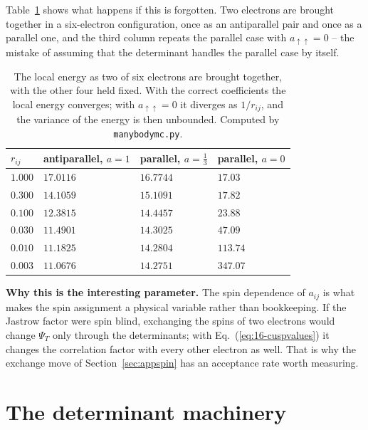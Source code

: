Table~\ref{tab:16-cusp} shows what happens if this is forgotten.  Two electrons
are brought together in a six-electron configuration, once as an antiparallel
pair and once as a parallel one, and the third column repeats the parallel case
with $a_{\uparrow\uparrow}=0$ -- the mistake of assuming that the determinant
handles the parallel case by itself.

\begin{table}[h]
\centering
\renewcommand{\arraystretch}{1.2}
\setlength{\tabcolsep}{14pt}
\begin{tabular}{llll}
\toprule
$r_{ij}$ & antiparallel, $a=1$ & parallel, $a=\tfrac13$
  & parallel, $a=0$\\
\midrule
$1.000$ & $17.0116$ & $16.7744$ & $17.03$\\
$0.300$ & $14.1059$ & $15.1091$ & $17.82$\\
$0.100$ & $12.3815$ & $14.4457$ & $23.88$\\
$0.030$ & $11.4901$ & $14.3025$ & $47.09$\\
$0.010$ & $11.1825$ & $14.2804$ & $113.74$\\
$0.003$ & $11.0676$ & $14.2751$ & $347.07$\\
\bottomrule
\end{tabular}
\caption{The local energy as two of six electrons are brought together, with
the other four held fixed.  With the correct coefficients the local energy
converges; with $a_{\uparrow\uparrow}=0$ it diverges as $1/r_{ij}$, and the
variance of the energy is then unbounded.  Computed by
\texttt{manybodymc.py}.}
\label{tab:16-cusp}
\end{table}

\begin{notebox}
\textbf{Why this is the interesting parameter.}  The spin dependence of
$a_{ij}$ is what makes the spin assignment a physical variable rather than
bookkeeping.  If the Jastrow factor were spin blind, exchanging the spins of
two electrons would change $\Psi_T$ only through the determinants; with
Eq.~(\ref{eq:16-cuspvalues}) it changes the correlation factor with every other
electron as well.  That is why the exchange move of
Section~\ref{sec:appspin} has an acceptance rate worth measuring.
\end{notebox}

\section{The determinant machinery}
\label{sec:appdeterminant}

